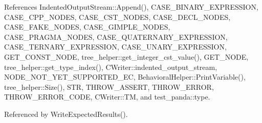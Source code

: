 References Indented\+Output\+Stream\+::\+Append(), C\+A\+S\+E\+\_\+\+B\+I\+N\+A\+R\+Y\+\_\+\+E\+X\+P\+R\+E\+S\+S\+I\+ON, C\+A\+S\+E\+\_\+\+C\+P\+P\+\_\+\+N\+O\+D\+ES, C\+A\+S\+E\+\_\+\+C\+S\+T\+\_\+\+N\+O\+D\+ES, C\+A\+S\+E\+\_\+\+D\+E\+C\+L\+\_\+\+N\+O\+D\+ES, C\+A\+S\+E\+\_\+\+F\+A\+K\+E\+\_\+\+N\+O\+D\+ES, C\+A\+S\+E\+\_\+\+G\+I\+M\+P\+L\+E\+\_\+\+N\+O\+D\+ES, C\+A\+S\+E\+\_\+\+P\+R\+A\+G\+M\+A\+\_\+\+N\+O\+D\+ES, C\+A\+S\+E\+\_\+\+Q\+U\+A\+T\+E\+R\+N\+A\+R\+Y\+\_\+\+E\+X\+P\+R\+E\+S\+S\+I\+ON, C\+A\+S\+E\+\_\+\+T\+E\+R\+N\+A\+R\+Y\+\_\+\+E\+X\+P\+R\+E\+S\+S\+I\+ON, C\+A\+S\+E\+\_\+\+U\+N\+A\+R\+Y\+\_\+\+E\+X\+P\+R\+E\+S\+S\+I\+ON, G\+E\+T\+\_\+\+C\+O\+N\+S\+T\+\_\+\+N\+O\+DE, tree\+\_\+helper\+::get\+\_\+integer\+\_\+cst\+\_\+value(), G\+E\+T\+\_\+\+N\+O\+DE, tree\+\_\+helper\+::get\+\_\+type\+\_\+index(), C\+Writer\+::indented\+\_\+output\+\_\+stream, N\+O\+D\+E\+\_\+\+N\+O\+T\+\_\+\+Y\+E\+T\+\_\+\+S\+U\+P\+P\+O\+R\+T\+E\+D\+\_\+\+EC, Behavioral\+Helper\+::\+Print\+Variable(), tree\+\_\+helper\+::\+Size(), S\+TR, T\+H\+R\+O\+W\+\_\+\+A\+S\+S\+E\+RT, T\+H\+R\+O\+W\+\_\+\+E\+R\+R\+OR, T\+H\+R\+O\+W\+\_\+\+E\+R\+R\+O\+R\+\_\+\+C\+O\+DE, C\+Writer\+::\+TM, and test\+\_\+panda\+::type.



Referenced by Write\+Expected\+Results().

